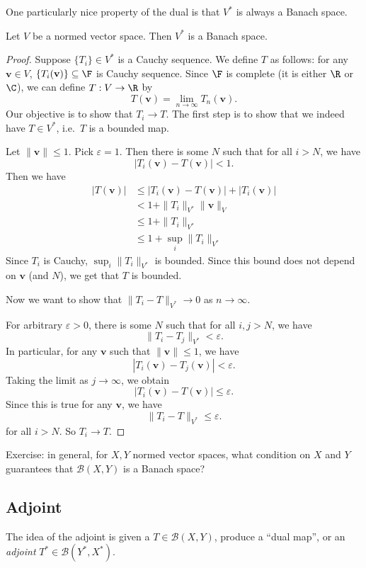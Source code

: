 \documentclass[a4paper]{article}
\begin{document}
One particularly nice property of the dual is that $V^*$ is always a Banach space.

\begin{prop}
  Let $V$ be a normed vector space. Then $V^*$ is a Banach space.
\end{prop}

\begin{proof}
  Suppose $\{T_i\} \in V^*$ is a Cauchy sequence. We define $T$ as follows: for any $\mathbf{v}\in V$, $\{T_i(\mathbf{v})\}\subseteq \F$ is Cauchy sequence. Since $\F$ is complete (it is either $\R$ or $\C$), we can define $T: V\to \R$ by
  \[
    T(\mathbf{v}) = \lim_{n \to \infty}T_n (\mathbf{v}).
  \]
  Our objective is to show that $T_i \to T$. The first step is to show that we indeed have $T \in V^*$, i.e.\ $T$ is a bounded map.

  Let $\|\mathbf{v}\| \leq 1$. Pick $\varepsilon = 1$. Then there is some $N$ such that for all $i > N$, we have
  \[
    |T_i(\mathbf{v}) - T(\mathbf{v})| < 1.
  \]
  Then we have
  \begin{align*}
    |T(\mathbf{v})| &\leq |T_i(\mathbf{v}) - T(\mathbf{v})| + |T_i(\mathbf{v})| \\
    &< 1 + \|T_i\|_{V^*}\|\mathbf{v}\|_V\\
    & \leq 1 + \|T_i\|_{V^*}\\
    &\leq 1 + \sup_i \|T_i\|_{V^*}
  \end{align*}
  Since $T_i$ is Cauchy, $\sup_i \|T_i\|_{V^*}$ is bounded. Since this bound does not depend on $\mathbf{v}$ (and $N$), we get that $T$ is bounded.

  Now we want to show that $\|T_i - T\|_{V^*} \to 0$ as $n\to \infty$.

  For arbitrary $\varepsilon > 0$, there is some $N$ such that for all $i, j > N$, we have
  \[
    \|T_i - T_j\|_{V^*} < \varepsilon.
  \]
  In particular, for any $\mathbf{v}$ such that $\|\mathbf{v}\| \leq 1$, we have
  \[
    |T_i(\mathbf{v}) - T_j(\mathbf{v})| < \varepsilon.
  \]
  Taking the limit as $j\to \infty$, we obtain
  \[
    |T_i(\mathbf{v}) - T(\mathbf{v})| \leq \varepsilon.
  \]
  Since this is true for any $\mathbf{v}$, we have
  \[
    \|T_i - T\|_{V^*} \leq \varepsilon.
  \]
  for all $i > N$. So $T_i \to T$.
\end{proof}
Exercise: in general, for $X, Y$ normed vector spaces, what condition on $X$ and $Y$ guarantees that $\mathcal{B}(X, Y)$ is a Banach space?

\subsection{Adjoint}
The idea of the adjoint is given a $T\in \mathcal{B}(X, Y)$, produce a ``dual map'', or an \emph{adjoint} $T^*\in \mathcal{B}(Y^*, X^*)$.
\end{document}
